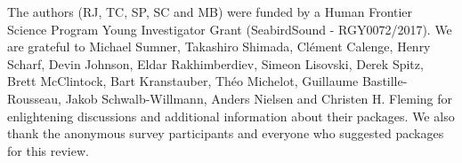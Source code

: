 \documentclass[a4paper,12pt]{article}
\begin{document}
	The authors (RJ, TC, SP, SC and MB) were funded by a Human Frontier Science Program Young Investigator Grant (SeabirdSound - RGY0072/2017). We are grateful to Michael Sumner, Takashiro Shimada,  Cl\'ement Calenge, Henry Scharf, Devin Johnson, Eldar Rakhimberdiev, Simeon Lisovski, Derek Spitz, Brett McClintock, Bart Kranstauber, Th\'eo Michelot, Guillaume Bastille-Rousseau, Jakob Schwalb-Willmann, Anders Nielsen and Christen H. Fleming for enlightening discussions and additional information about their packages. We also thank the anonymous survey participants and everyone who suggested packages for this review.
	
	\newpage
	
	
	
	
	
	
	
\end{document}
